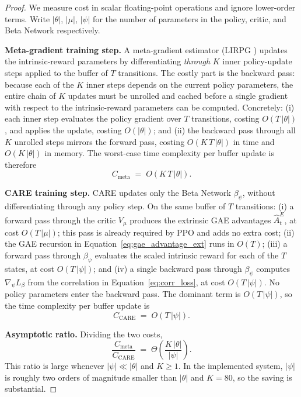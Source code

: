 \begin{proof}
We measure cost in scalar floating-point operations and ignore lower-order terms.
Write $|\theta|$, $|\mu|$, $|\psi|$ for the number of parameters in the policy, critic, and Beta Network respectively.

\textbf{Meta-gradient training step.} A meta-gradient estimator (LIRPG \cite{zheng2018lirpg}) updates the intrinsic-reward parameters by differentiating \emph{through} $K$ inner policy-update steps applied to the buffer of $T$ transitions. The costly part is the backward pass: because each of the $K$ inner steps depends on the current policy parameters, the entire chain of $K$ updates must be unrolled and cached before a single gradient with respect to the intrinsic-reward parameters can be computed. Concretely:
(i) each inner step evaluates the policy gradient over $T$ transitions, costing $O(T\,|\theta|)$, and applies the update, costing $O(|\theta|)$; and
(ii) the backward pass through all $K$ unrolled steps mirrors the forward pass, costing $O(K\,T\,|\theta|)$ in time and $O(K\,|\theta|)$ in memory.
The worst-case time complexity per buffer update is therefore
\begin{equation*}
C_\text{meta} \;=\; O(K\, T\, |\theta|).
\end{equation*}

\textbf{CARE training step.} CARE updates only the Beta Network $\beta_\psi$, without differentiating through any policy step. On the same buffer of $T$ transitions:
(i) a forward pass through the critic $V_\mu$ produces the extrinsic GAE advantages $\hat A_t^{E}$, at cost $O(T\,|\mu|)$; this pass is already required by PPO and adds no extra cost;
(ii) the GAE recursion in Equation~\eqref{eq:gae_advantage_ext} runs in $O(T)$;
(iii) a forward pass through $\beta_\psi$ evaluates the scaled intrinsic reward for each of the $T$ states, at cost $O(T\,|\psi|)$; and
(iv) a single backward pass through $\beta_\psi$ computes $\nabla_\psi L_\beta$ from the correlation in Equation~\eqref{eq:corr_loss}, at cost $O(T\,|\psi|)$.
No policy parameters enter the backward pass. The dominant term is $O(T\,|\psi|)$, so the time complexity per buffer update is
\begin{equation*}
C_\text{CARE} \;=\; O(T\, |\psi|).
\end{equation*}

\textbf{Asymptotic ratio.} Dividing the two costs,
\begin{equation*}
\frac{C_\text{meta}}{C_\text{CARE}} \;=\; \Theta\!\left( \frac{K\, |\theta|}{|\psi|} \right).
\end{equation*}
This ratio is large whenever $|\psi| \ll |\theta|$ and $K \ge 1$. In the implemented system, $|\psi|$ is roughly two orders of magnitude smaller than $|\theta|$ and $K = 80$, so the saving is substantial.
\end{proof}

